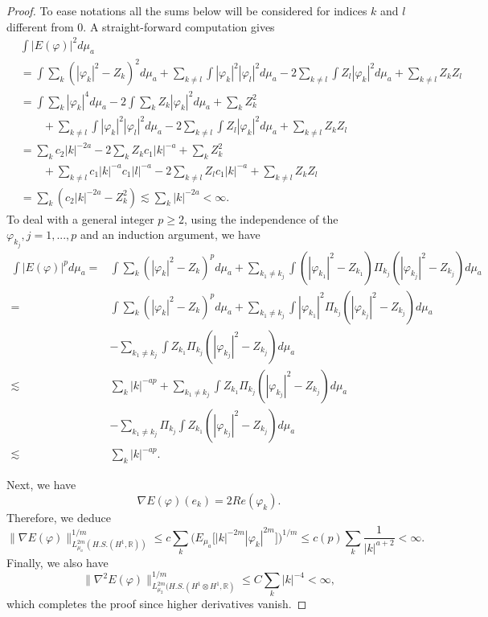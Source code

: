 \documentclass[11pt,leqno]{amsart}
\begin{document}
\begin{proof}
To ease notations all the sums below will be considered for indices $k$ and $l$ different from 0.  A straight-forward computation gives
\begin{align*}
&\int |E(\varphi)|^2 d\mu_a \\
&= \int \sum_k (|\varphi_k|^2 -Z_k)^2 d\mu_a+ \sum_{k\neq l} \int |\varphi_k|^2 |\varphi_l|^2 d\mu_a - 2 \sum_{k\neq l} \int Z_l |\varphi_k|^2 d\mu_a + \sum_{k\neq l} Z_k Z_l\\
&= \int \sum_k |\varphi_k|^4 d\mu_a - 2 \int \sum_k Z_k |\varphi_k|^2 d\mu_a + \sum_k Z_k^2 \\
&\qquad + \sum_{k\neq l} \int |\varphi_k|^2 |\varphi_l|^2 d\mu_a - 2 \sum_{k\neq l} \int Z_l |\varphi_k|^2 d\mu_a + \sum_{k\neq l} Z_k Z_l\\
&= \sum_k c_2 |k|^{-2a}  -2 \sum_k Z_k c_1 |k|^{-a} + \sum_k Z_k^2 \\
&\qquad +  \sum_{k\neq l} c_1 |k|^{-a}  c_1 |l|^{-a}  -2 \sum_{k\neq l} Z_l c_1 |k|^{-a} + \sum_{k\neq l} Z_k Z_l\\
&= \sum_k  (c_2 |k|^{-2a} - Z_k^2 ) \lesssim  \sum_k  |k|^{-2a} <\infty .
\end{align*}
To deal with a general integer $p\geq 2$, using the independence of the $\varphi_{k_j}, j=1, ..., p$ 
and an induction argument, we have
\begin{align*}
\int |E(\varphi)|^p d\mu_a =& \int \sum_k (|\varphi_k|^2 -Z_k)^p d\mu_a + \sum_{k_1\neq k_j} \int ( |\varphi_{k_1}|^2 -Z_{k_1}) \Pi_{k_j} ( |\varphi_{k_j}|^2 -Z_{k_j}) d\mu_a
\\
= & \int \sum_k (|\varphi_k|^2 -Z_k)^p d\mu_a + \sum_{k_1\neq k_j}  \int  |\varphi_{k_1}|^2 \Pi_{k_j}( |\varphi_{k_j}|^2 -Z_{k_j})d\mu_a 
\\
& - \sum_{k_1\neq k_j} \int  Z_{k_1} \Pi_{k_j} ( |\varphi_{k_j}|^2 -Z_{k_j}) d\mu_a  \\
\lesssim & \sum_k |k|^{-ap}+  \sum_{k_1\neq k_j}  \int  Z_{k_1} \Pi_{k_j} ( |\varphi_{k_j}|^2 -Z_{k_j}) d\mu_a
  \\
& - \sum_{k_1\neq k_j} \Pi_{k_j} \int  Z_{k_1} ( |\varphi_{k_j}|^2 -Z_{k_j}) d\mu_a\\
\lesssim &\sum_k |k|^{-ap}.
\end{align*}

Next, we have
$$\nabla E (\varphi)(e_k)= 2 Re (\varphi_k ).$$
Therefore, we deduce 
$$\| \nabla E(\varphi) \|_{L_{\mu_a}^{2m} ( H.S. ( H^1 , \mathbb R ) )}^{1/m} \leq c \sum_{k} \big( E_{\mu_a} \big[  |k|^{-2m} |\varphi_k|^{2m}\big] \big)^{1/m} 
\leq c(p) \sum_{k} \dfrac{1}{|k|^{a+2}}<\infty. $$
Finally, we also have
$$\| \nabla^2 E(\varphi) \|_{L_{\mu_2}^{2m} ( H.S. ( H^1 \otimes H^1 ,  \mathbb R) }^{1/m} \leq C   \sum_k |k|^{ -4  } <\infty , $$
which completes the proof since higher derivatives vanish.
\end{proof}
\end{document}
